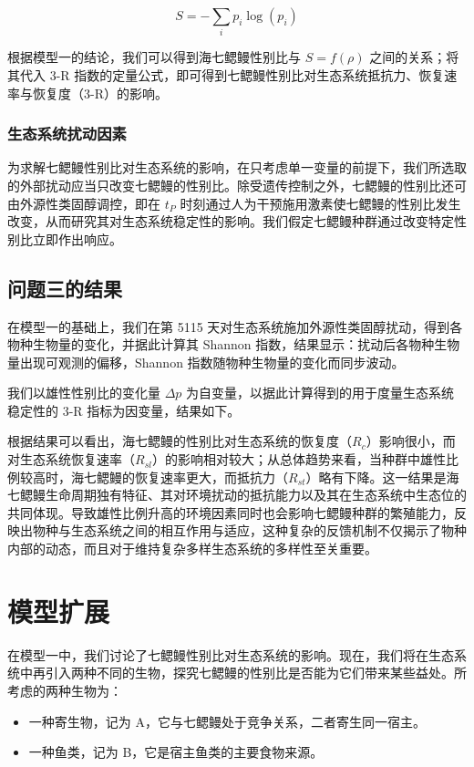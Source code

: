 \documentclass[11pt,a4paper]{ctexart}
\begin{document}
\begin{equation}
S=-\sum_{i}p_i\log(p_i)
\end{equation}

根据模型一的结论，我们可以得到海七鳃鳗性别比与 $S=f(\rho)$ 之间的关系；将其代入 3-R 指数的定量公式，即可得到七鳃鳗性别比对生态系统抵抗力、恢复速率与恢复度（3-R）的影响。

\subsubsection{生态系统扰动因素}

为求解七鳃鳗性别比对生态系统的影响，在只考虑单一变量的前提下，我们所选取的外部扰动应当只改变七鳃鳗的性别比。除受遗传控制之外，七鳃鳗的性别比还可由外源性类固醇调控\cite{20}，即在 $t_P$ 时刻通过人为干预施用激素使七鳃鳗的性别比发生改变，从而研究其对生态系统稳定性的影响。我们假定七鳃鳗种群通过改变特定性别比立即作出响应。

\subsection{问题三的结果}

在模型一的基础上，我们在第 5115 天对生态系统施加外源性类固醇扰动，得到各物种生物量的变化，并据此计算其 Shannon 指数，结果显示：扰动后各物种生物量出现可观测的偏移，Shannon 指数随物种生物量的变化而同步波动。

我们以雄性性别比的变化量 $\Delta p$ 为自变量，以据此计算得到的用于度量生态系统稳定性的 3-R 指标为因变量，结果如下。

根据结果可以看出，海七鳃鳗的性别比对生态系统的恢复度（$R_c$）影响很小，而对生态系统恢复速率（$R_{sl}$）的影响相对较大；从总体趋势来看，当种群中雄性比例较高时，海七鳃鳗的恢复速率更大，而抵抗力（$R_{st}$）略有下降。这一结果是海七鳃鳗生命周期独有特征、其对环境扰动的抵抗能力以及其在生态系统中生态位的共同体现。导致雄性比例升高的环境因素同时也会影响七鳃鳗种群的繁殖能力，反映出物种与生态系统之间的相互作用与适应，这种复杂的反馈机制不仅揭示了物种内部的动态，而且对于维持复杂多样生态系统的多样性至关重要。

\section{模型扩展}

在模型一中，我们讨论了七鳃鳗性别比对生态系统的影响。现在，我们将在生态系统中再引入两种不同的生物，探究七鳃鳗的性别比是否能为它们带来某些益处。所考虑的两种生物为：

\begin{itemize}
\item 一种寄生物，记为 A，它与七鳃鳗处于竞争关系，二者寄生同一宿主。
\item 一种鱼类，记为 B，它是宿主鱼类的主要食物来源。
\end{itemize}
\end{document}
